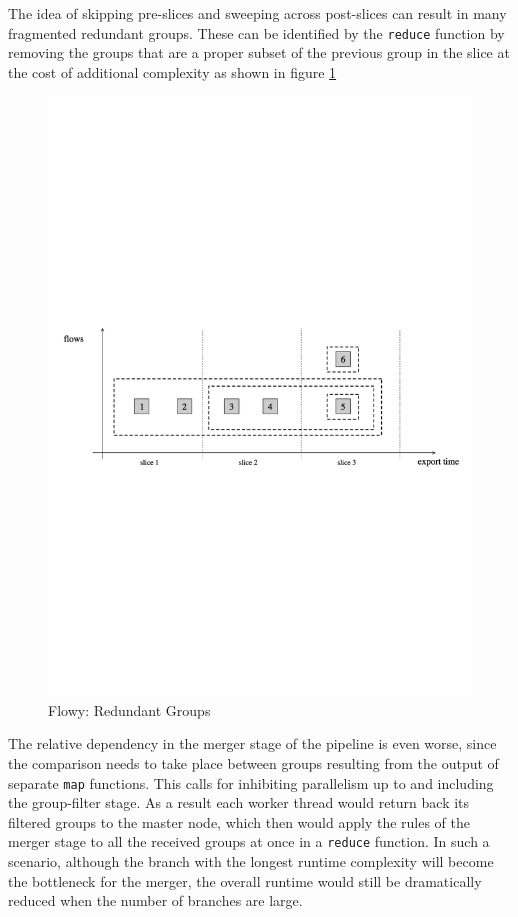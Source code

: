 The idea of skipping pre-slices and sweeping across post-slices can result in
many fragmented redundant groups. These can be identified by the
\texttt{reduce} function by removing the groups that are a proper subset of
the previous group in the slice at the cost of additional complexity as shown
in figure \ref{fig:flowy-redundant-groups}

\begin{figure}[h!]
\begin{center}
  \includegraphics* [width=0.7\linewidth]{figures/flowy-redundant-groups}
  \caption{Flowy: Redundant Groups \cite{pnemeth:thesis:2010}}
  \label{fig:flowy-redundant-groups}
\end{center}
\end{figure}

The relative dependency in the merger stage of the pipeline is even worse,
since the comparison needs to take place between groups resulting from the
output of separate \texttt{map} functions. This calls for inhibiting
parallelism up to and including the group-filter stage. As a result each
worker thread would return back its filtered groups to the master node, which
then  would apply the rules of the
merger stage to all the received groups at once in a \texttt{reduce} function.
In such a scenario, although the branch with the longest runtime complexity
will become the bottleneck for the merger, the overall runtime would still be
dramatically reduced when the number of branches are large.

